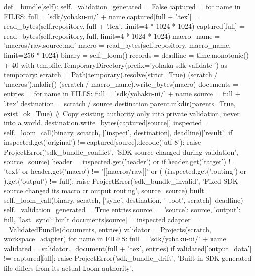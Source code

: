     def _bundle(self):
        self._validation_generated = False
        captured = {}
        for name in FILES:
            full = 'sdk/yohaku-ui/' + name
            captured[full + '.tex'] = read_bytes(self.repository, full + '.tex', limit=4 * 1024 * 1024)
            captured[full] = read_bytes(self.repository, full, limit=4 * 1024 * 1024)
        macro_name = 'macros/raw.source.md'
        macro = read_bytes(self.repository, macro_name, limit=256 * 1024)
        binary = self._loom()
        records = {}
        deadline = time.monotonic() + 40
        with tempfile.TemporaryDirectory(prefix='yohaku-sdk-validate-') as temporary:
            scratch = Path(temporary).resolve(strict=True)
            (scratch / 'macros').mkdir()
            (scratch / macro_name).write_bytes(macro)
            documents = {}
            entries = {}
            for name in FILES:
                full = 'sdk/yohaku-ui/' + name
                source = full + '.tex'
                destination = scratch / source
                destination.parent.mkdir(parents=True, exist_ok=True)
                # Copy existing authority only into private validation, never into a world.
                destination.write_bytes(captured[source])
                inspected = self._loom_call(binary, scratch, ['inspect', destination], deadline)['result']
                if inspected.get('original') != captured[source].decode('utf-8'):
                    raise ProjectError('sdk_bundle_conflict', 'SDK source changed during validation', source=source)
                header = inspected.get('header') or {}
                if header.get('target') != 'text' or header.get('macro') != '[[macros/raw]]' or (
                        (inspected.get('routing') or {}).get('output') != full):
                    raise ProjectError('sdk_bundle_invalid', 'Fixed SDK source changed its macro or output routing', source=source)
                built = self._loom_call(binary, scratch, ['sync', destination, '--root', scratch], deadline)
                self._validation_generated = True
                entries[source] = {'source': source, 'output': full,
                                   'last_sync': built}
                documents[source] = inspected
            adapter = _ValidatedBundle(documents, entries)
            validator = Projects(scratch, workspace=adapter)
            for name in FILES:
                full = 'sdk/yohaku-ui/' + name
                validated = validator._document(full + '.tex', entries)
                if validated['output_data'] != captured[full]:
                    raise ProjectError('sdk_bundle_drift', 'Built-in SDK generated file differs from its actual Loom authority',
